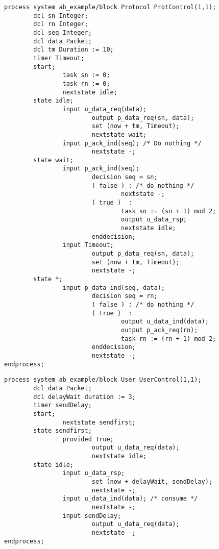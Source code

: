 \begin{verbatim}
process system ab_example/block Protocol ProtControl(1,1);
        dcl sn Integer;
        dcl rn Integer;
        dcl seq Integer;
        dcl data Packet;
        dcl tm Duration := 10;
        timer Timeout;
        start;
                task sn := 0;
                task rn := 0;
                nextstate idle;
        state idle;
                input u_data_req(data);
                        output p_data_req(sn, data);
                        set (now + tm, Timeout); 
                        nextstate wait;
                input p_ack_ind(seq); /* Do nothing */
                        nextstate -;
        state wait;
                input p_ack_ind(seq);
                        decision seq = sn;
                        ( false ) : /* do nothing */
                                nextstate -;
                        ( true )  :
                                task sn := (sn + 1) mod 2;
                                output u_data_rsp;
                                nextstate idle;
                        enddecision;
                input Timeout;
                        output p_data_req(sn, data);
                        set (now + tm, Timeout); 
                        nextstate -;
        state *;
                input p_data_ind(seq, data);
                        decision seq = rn;
                        ( false ) : /* do nothing */
                        ( true )  :
                                output u_data_ind(data);
                                output p_ack_req(rn);
                                task rn := (rn + 1) mod 2;
                        enddecision;
                        nextstate -;
endprocess;
\end{verbatim}
\newpage
\begin{verbatim}
process system ab_example/block User UserControl(1,1);
        dcl data Packet;
        dcl delayWait duration := 3;
        timer sendDelay;
        start;
                nextstate sendfirst;
        state sendfirst;
                provided True;
                        output u_data_req(data);
                        nextstate idle;
        state idle;
                input u_data_rsp;
                        set (now + delayWait, sendDelay);
                        nextstate -;
                input u_data_ind(data); /* consume */
                        nextstate -;
                input sendDelay;
                        output u_data_req(data);
                        nextstate -;
endprocess;
\end{verbatim}


